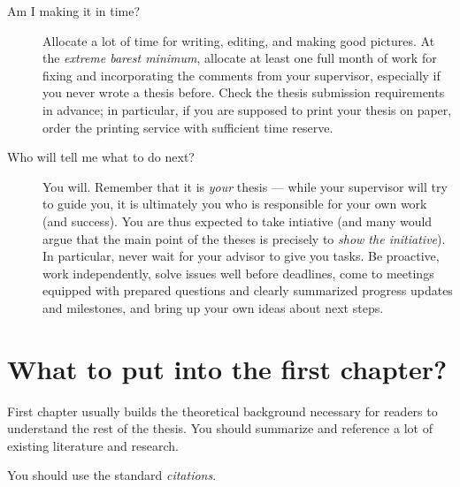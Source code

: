 \begin{description}
\item[Am I making it in time?]
Allocate a lot of time for writing, editing, and making good pictures. At the \emph{extreme barest minimum}, allocate at least one full month of work for fixing and incorporating the comments from your supervisor, especially if you never wrote a thesis before. Check the thesis submission requirements in advance; in particular, if you are supposed to print your thesis on paper, order the printing service with sufficient time reserve.
\item[Who will tell me what to do next?]
You will. Remember that it is \emph{your} thesis --- while your supervisor will try to guide you, it is ultimately you who is responsible for your own work (and success). You are thus expected to take intiative (and many would argue that the main point of the theses is precisely to \emph{show the initiative}). In particular, never wait for your advisor to give you tasks. Be proactive, work independently, solve issues well before deadlines, come to meetings equipped with prepared questions and clearly summarized progress updates and milestones, and bring up your own ideas about next steps.
\end{description}

\section{What to put into the first chapter?}

First chapter usually builds the theoretical background necessary for readers to understand the rest of the thesis. You should summarize and reference a lot of existing literature and research.

You should use the standard \emph{citations}.

